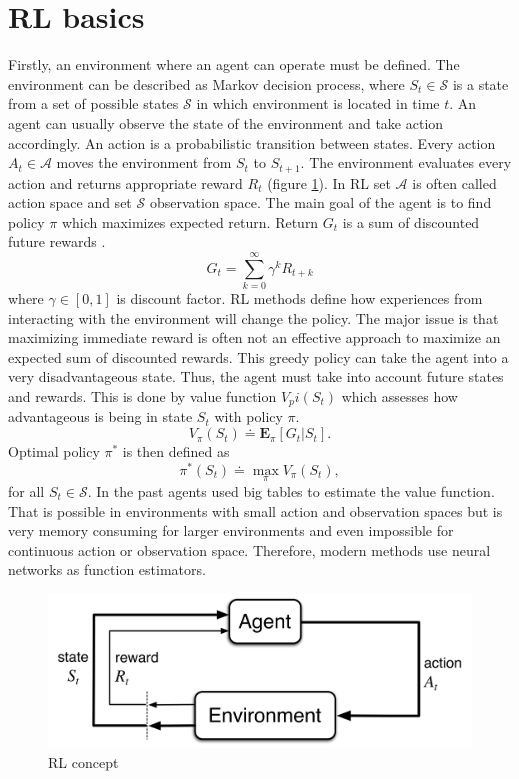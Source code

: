 \section{RL basics}
Firstly, an environment where an agent can operate must be defined. The environment can be described as Markov decision process, where $S_t \in \mathcal{S}$ is a state from a set of possible states $\mathcal{S}$ in which environment is located in time $t$. An agent can usually observe the state of the environment and take action accordingly. An action is a probabilistic transition between states. Every action $A_t \in \mathcal{A}$ moves the environment from $S_t$ to $S_{t+1}$. The environment evaluates every action and returns appropriate reward $R_t$ (figure \ref{fig:rlconcept}). In RL set $\mathcal{A}$ is often called action space and set $\mathcal{S}$ observation space. The main goal of the agent is to find policy $\pi$ which maximizes expected return. Return $G_t$ is a sum of discounted future rewards \cite{sutton2012}.
\begin{equation}
G_t = \sum\limits_{k=0}^{\infty}\gamma^k R_{t+k}
\end{equation}
where $\gamma \in [0,1]$ is discount factor. RL methods define how experiences from interacting with the environment will change the policy.  The major issue is that maximizing immediate reward is often not an effective approach to maximize an expected sum of discounted rewards. This greedy policy can take the agent into a very disadvantageous state. Thus, the agent must take into account future states and rewards. This is done by value function $V_pi(S_t)$ which assesses how advantageous is being in state $S_t$ with policy $\pi$.
\begin{equation}
V_\pi(S_t) \doteq  \mathbf{E}_\pi[G_t | S_t].
\end{equation}
Optimal policy $\pi^*$ is then defined as
\begin{equation}
\pi^*(S_t) \doteq \max\limits_\pi V_\pi(S_t),
\end{equation}
for all $S_t \in \mathcal{S}$.
In the past agents used big tables to estimate the value function. That is possible in environments with small action and observation spaces but is very memory consuming for larger environments and even impossible for continuous action or observation space. Therefore, modern methods use neural networks as function estimators.
\begin{figure}[!h]
\centering
\includegraphics[scale=0.3]{fig/RL-concept.png}
\caption{RL concept}
\label{fig:rlconcept}
\end{figure}
\pagebreak

